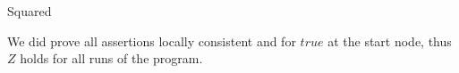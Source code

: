 \documentclass[
  english
]{tumteaching}
\begin{document}
\begin{assignment}[L]{Squared}
\begin{solution}
		
		\noindent We did prove all assertions locally consistent and for $true$ at the start node, thus $Z$ holds for all runs of the program.
		

\end{solution}
\end{assignment}
\end{document}
